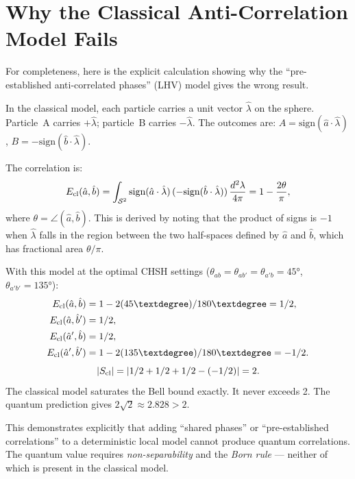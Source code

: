 \documentclass[11pt,a4paper]{article}
\begin{document}
\section{Why the Classical Anti-Correlation Model Fails}
\label{app:classical}

For completeness, here is the explicit calculation showing why the
``pre-established anti-correlated phases'' (LHV) model gives the
wrong result.

In the classical model, each particle carries a unit vector $\hat{\lambda}$
on the sphere.  Particle~A carries $+\hat{\lambda}$; particle~B carries
$-\hat{\lambda}$.  The outcomes are:
$A = \text{sign}(\hat{a}\cdot\hat{\lambda})$,
$B = -\text{sign}(\hat{b}\cdot\hat{\lambda})$.

The correlation is:
\begin{equation}
E_{\rm cl}(\hat{a},\hat{b})
= \int_{\mathcal{S}^2} \text{sign}(\hat{a}\cdot\hat{\lambda})\,
  (-\text{sign}(\hat{b}\cdot\hat{\lambda}))\,\frac{d^2\lambda}{4\pi}
= 1 - \frac{2\theta}{\pi},
\label{eq:classicalcalc}
\end{equation}
where $\theta = \angle(\hat{a},\hat{b})$.  This is derived by noting
that the product of signs is $-1$ when $\hat{\lambda}$ falls in the
region between the two half-spaces defined by $\hat{a}$ and $\hat{b}$,
which has fractional area $\theta/\pi$.

With this model at the optimal CHSH settings ($\theta_{ab} = \theta_{ab'}
= \theta_{a'b} = 45°$, $\theta_{a'b'} = 135°$):
\begin{align}
E_{\rm cl}(\hat{a},\hat{b}) &= 1 - 2(45°)/180° = 1/2, \\
E_{\rm cl}(\hat{a},\hat{b}') &= 1/2, \\
E_{\rm cl}(\hat{a}',\hat{b}) &= 1/2, \\
E_{\rm cl}(\hat{a}',\hat{b}') &= 1 - 2(135°)/180° = -1/2.
\end{align}
\begin{equation}
|S_{\rm cl}| = |1/2 + 1/2 + 1/2 - (-1/2)| = 2.
\end{equation}
The classical model saturates the Bell bound exactly.  It never exceeds 2.
The quantum prediction gives $2\sqrt{2} \approx 2.828 > 2$.

This demonstrates explicitly that adding ``shared phases'' or
``pre-established correlations'' to a deterministic local model cannot
produce quantum correlations.  The quantum value requires
\emph{non-separability} and the \emph{Born rule} --- neither of which
is present in the classical model.
\end{document}
